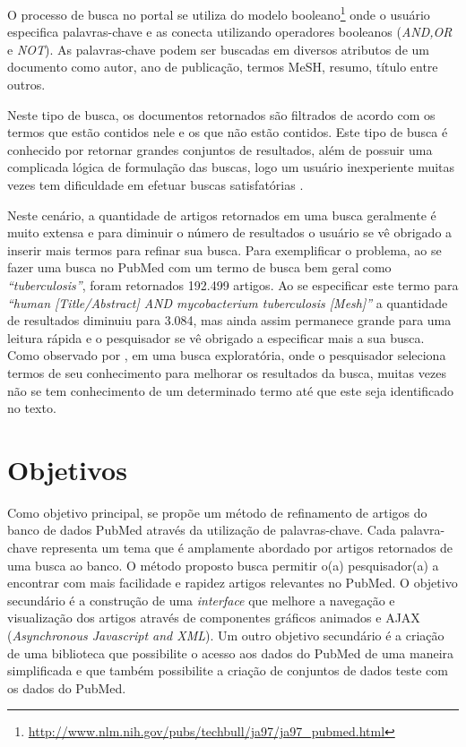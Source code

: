 O processo de busca no portal se utiliza do modelo booleano\footnote{\href{http://www.nlm.nih.gov/pubs/techbull/ja97/ja97\_pubmed.html}{http://www.nlm.nih.gov/pubs/techbull/ja97/ja97\_pubmed.html}} onde o usuário especifica palavras-chave e as conecta utilizando operadores booleanos (\emph{AND,OR} e \emph{NOT}). As palavras-chave podem ser buscadas em diversos atributos de um documento como autor, ano de publicação, termos MeSH, resumo, título entre outros. 

Neste tipo de busca, os documentos retornados são filtrados de acordo com os termos que estão contidos nele e os que não estão contidos. Este tipo de busca é conhecido por retornar grandes conjuntos de resultados, além de possuir uma complicada lógica de formulação das buscas, logo um usuário inexperiente muitas vezes tem dificuldade em efetuar buscas satisfatórias \cite{Jackson2007}. 

Neste cenário, a quantidade de artigos retornados em uma busca geralmente é muito extensa e para diminuir o número de resultados o usuário se vê obrigado a inserir mais termos para refinar sua busca. Para exemplificar o problema, ao se fazer uma busca no PubMed com um termo de busca bem geral como \emph{“tuberculosis”}, foram retornados 192.499 artigos. Ao se especificar este termo para \emph{“human [Title/Abstract] AND mycobacterium tuberculosis [Mesh]”} a quantidade de resultados diminuiu para 3.084, mas ainda assim permanece grande para uma leitura rápida e o pesquisador se vê obrigado a especificar mais a sua busca. Como observado por \cite{Perez-Iratxeta2001}, em uma busca exploratória, onde o pesquisador seleciona termos de seu conhecimento para melhorar os resultados da busca, muitas vezes não se tem conhecimento de um determinado termo até que este seja identificado no texto.

\section{Objetivos}
Como objetivo principal, se propõe um método de refinamento de artigos do banco de dados PubMed através da utilização de palavras-chave. Cada palavra-chave representa um tema que é amplamente abordado por artigos retornados de uma busca ao banco. O método proposto busca permitir o(a) pesquisador(a) a encontrar com mais facilidade e rapidez artigos relevantes no PubMed. O objetivo secundário é a construção de uma \emph{interface} que melhore a navegação e visualização dos artigos através de componentes gráficos animados e AJAX (\emph{Asynchronous Javascript and XML}). Um outro objetivo secundário é a criação de uma biblioteca que possibilite o acesso aos dados do PubMed de uma maneira simplificada e que também possibilite a criação de conjuntos de dados teste com os dados do PubMed.

